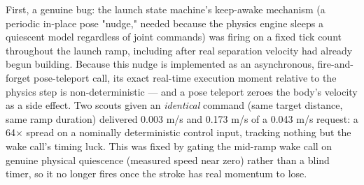 \documentclass[conference]{IEEEtran}
\begin{document}
First, a genuine bug: the launch state machine's keep-awake mechanism (a periodic in-place pose "nudge," needed because the physics engine sleeps a quiescent model regardless of joint commands) was firing on a fixed tick count throughout the launch ramp, including after real separation velocity had already begun building. Because this nudge is implemented as an asynchronous, fire-and-forget pose-teleport call, its exact real-time execution moment relative to the physics step is non-deterministic --- and a pose teleport zeroes the body's velocity as a side effect. Two scouts given an \emph{identical} command (same target distance, same ramp duration) delivered 0.003 m/s and 0.173 m/s of a 0.043 m/s request: a 64$\times$ spread on a nominally deterministic control input, tracking nothing but the wake call's timing luck. This was fixed by gating the mid-ramp wake call on genuine physical quiescence (measured speed near zero) rather than a blind timer, so it no longer fires once the stroke has real momentum to lose.
\end{document}
